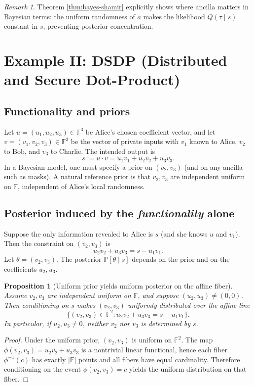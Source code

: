 \documentclass[11pt,a4paper]{article}
\newtheorem{proposition}[theorem]{Proposition}
\theoremstyle{definition}
\theoremstyle{remark}
\newtheorem{remark}[theorem]{Remark}
\newcommand{\F}{\mathbb{F}}
\newcommand{\Prb}{\mathbb{P}}
\begin{document}
\begin{remark}
Theorem \cref{thm:bayes-shamir} explicitly shows where ancilla matters in Bayesian terms: the uniform randomness of \(a\) makes the likelihood \(Q(\tau\mid s)\) constant in \(s\), preventing posterior concentration.
\end{remark}

\section{Example II: DSDP (Distributed and Secure Dot-Product)}
\label{sec:bayes-dsdp}

\subsection{Functionality and priors}
Let \(u=(u_1,u_2,u_3)\in\F^3\) be Alice's chosen coefficient vector, and let \(v=(v_1,v_2,v_3)\in\F^3\) be the vector of private inputs with \(v_1\) known to Alice, \(v_2\) to Bob, and \(v_3\) to Charlie. The intended output is
\[
s := u\cdot v = u_1 v_1 + u_2 v_2 + u_3 v_3.
\]
In a Bayesian model, one must specify a prior on \((v_2,v_3)\) (and on any ancilla such as masks). A natural reference prior is that \(v_2,v_3\) are independent uniform on \(\F\), independent of Alice's local randomness.

\subsection{Posterior induced by the \emph{functionality} alone}
Suppose the only information revealed to Alice is \(s\) (and she knows \(u\) and \(v_1\)). Then the constraint on \((v_2,v_3)\) is
\[
u_2 v_2 + u_3 v_3 = s - u_1 v_1.
\]
Let \(\theta=(v_2,v_3)\). The posterior \(\Prb[\theta\mid s]\) depends on the prior and on the coefficients \(u_2,u_3\).

\begin{proposition}[Uniform prior yields uniform posterior on the affine fiber]
\label{prop:dsdp-bayes-fiber}
Assume \(v_2,v_3\) are independent uniform on \(\F\), and suppose \((u_2,u_3)\neq (0,0)\). Then conditioning on \(s\) makes \((v_2,v_3)\) uniformly distributed over the affine line
\[
\{(v_2,v_3)\in\F^2 : u_2 v_2 + u_3 v_3 = s-u_1 v_1\}.
\]
In particular, if \(u_2,u_3\neq 0\), neither \(v_2\) nor \(v_3\) is determined by \(s\).
\end{proposition}

\begin{proof}
Under the uniform prior, \((v_2,v_3)\) is uniform on \(\F^2\). The map \(\phi(v_2,v_3)=u_2 v_2 + u_3 v_3\) is a nontrivial linear functional, hence each fiber \(\phi^{-1}(c)\) has exactly \(|\F|\) points and all fibers have equal cardinality. Therefore conditioning on the event \(\phi(v_2,v_3)=c\) yields the uniform distribution on that fiber.
\end{proof}
\end{document}
